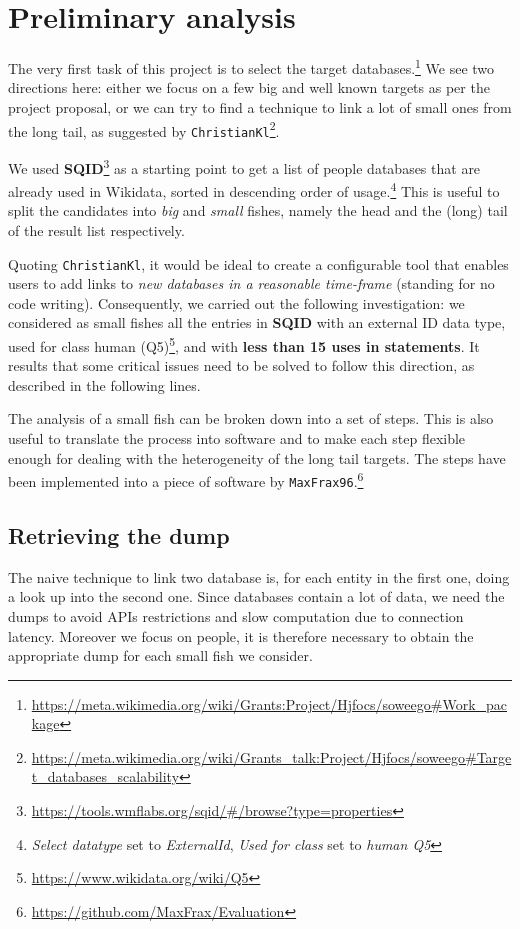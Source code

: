 \chapter{Preliminary analysis}
\label{cha:3}
The very first task of this project is to select the target databases.\footnote{\url{https://meta.wikimedia.org/wiki/Grants:Project/Hjfocs/soweego\#Work_package}} We see two directions here: either we focus on a few big and well known targets as per the project proposal, or we can try to find a technique to link a lot of small ones from the long tail, as suggested by \texttt{ChristianKl}\footnote{\url{https://meta.wikimedia.org/wiki/Grants_talk:Project/Hjfocs/soweego\#Target_databases_scalability}}.

We used \textbf{SQID}\footnote{\url{https://tools.wmflabs.org/sqid/\#/browse?type=properties}} as a starting point to get a list of people databases that are already used in Wikidata, sorted in descending order of usage.\footnote{\textit{Select datatype} set to \textit{ExternalId}, \textit{Used for class} set to \textit{human Q5}} This is useful to split the candidates into \textit{big} and \textit{small} fishes, namely the head and the (long) tail of the result list respectively.

Quoting \texttt{ChristianKl}, it would be ideal to create a configurable tool that enables users to add links to \textit{new databases in a reasonable time-frame} (standing for no code writing). Consequently, we carried out the following investigation: we considered as small fishes all the entries in \textbf{SQID} with an external ID data type, used for class  human (Q5)\footnote{\url{https://www.wikidata.org/wiki/Q5}}, and with \textbf{less than 15 uses in statements}. It results that some critical issues need to be solved to follow this direction, as described in the following lines.

The analysis of a small fish can be broken down into a set of steps. This is also useful to translate the process into software and to make each step flexible enough for dealing with the heterogeneity of the long tail targets. The steps have been implemented into a piece of software by \texttt{MaxFrax96}.\footnote{\url{https://github.com/MaxFrax/Evaluation}}

\section{Retrieving the dump}
\label{cha:31}
The naive technique to link two database is, for each entity in the first one, doing a look up into the second one. Since databases contain a lot of data, we need the dumps to avoid APIs restrictions and slow computation due to connection latency.
Moreover we focus on people, it is therefore necessary to obtain the appropriate dump for each small fish we consider.

